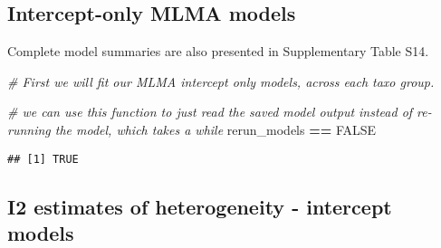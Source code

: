 \documentclass[]{article}
\newenvironment{Shaded}{\begin{snugshade}}{\end{snugshade}}
\newcommand{\KeywordTok}[1]{\textcolor[rgb]{0.13,0.29,0.53}{\textbf{#1}}}
\newcommand{\DataTypeTok}[1]{\textcolor[rgb]{0.13,0.29,0.53}{#1}}
\newcommand{\StringTok}[1]{\textcolor[rgb]{0.31,0.60,0.02}{#1}}
\newcommand{\CommentTok}[1]{\textcolor[rgb]{0.56,0.35,0.01}{\textit{#1}}}
\newcommand{\OtherTok}[1]{\textcolor[rgb]{0.56,0.35,0.01}{#1}}
\newcommand{\ControlFlowTok}[1]{\textcolor[rgb]{0.13,0.29,0.53}{\textbf{#1}}}
\newcommand{\OperatorTok}[1]{\textcolor[rgb]{0.81,0.36,0.00}{\textbf{#1}}}
\newcommand{\NormalTok}[1]{#1}
\begin{document}
\subsection{Intercept-only MLMA
models}\label{intercept-only-mlma-models}

Complete model summaries are also presented in Supplementary Table S14.

\begin{Shaded}
\begin{Highlighting}[]
\CommentTok{# First we will fit our MLMA intercept only models, across each taxo group. }

  \CommentTok{# we can use this function to just read the saved model output instead of re-running the model, which takes a while}
\NormalTok{rerun_models }\OperatorTok{==}\StringTok{ }\OtherTok{FALSE}
\end{Highlighting}
\end{Shaded}

\begin{verbatim}
## [1] TRUE
\end{verbatim}

\begin{Shaded}
\end{Shaded}

\subsection{I2 estimates of heterogeneity - intercept
models}\label{i2-estimates-of-heterogeneity---intercept-models}
\end{document}
